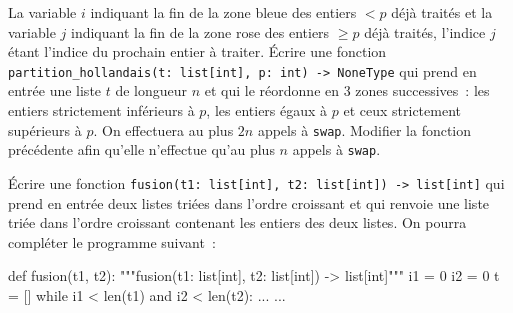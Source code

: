 \documentclass{magnolia}
\begin{document}
\begin{questions}
\begin{center}
\end{center}
La variable $i$ indiquant la fin de la zone bleue des entiers $< p$ déjà traités et
la variable $j$ indiquant la fin de la zone rose des entiers $\geq p$ déjà traités,
l'indice $j$ étant l'indice du prochain entier à traiter.
\question Écrire une fonction \verb!partition_hollandais(t: list[int], p: int) -> NoneType! qui prend
  en entrée une liste $t$ de longueur $n$ et qui le réordonne en 3 zones successives~:
  les entiers strictement inférieurs à $p$, les entiers égaux à $p$ et ceux strictement
  supérieurs à $p$. On effectuera au plus $2n$ appels à \verb!swap!.
\question Modifier la fonction précédente afin qu'elle n'effectue qu'au plus $n$ appels
  à \verb!swap!.
\end{questions}




Écrire une fonction \verb!fusion(t1: list[int], t2: list[int]) -> list[int]! qui prend en
entrée deux listes triées dans l'ordre croissant et qui renvoie une liste triée dans
l'ordre croissant contenant les entiers des deux listes. On pourra compléter le programme
suivant~:
\begin{pythoncode}
def fusion(t1, t2):
    """fusion(t1: list[int], t2: list[int]) -> list[int]"""
    i1 = 0
    i2 = 0
    t = []
    while i1 < len(t1) and i2 < len(t2):
        ...
    ...
\end{pythoncode}


\end{document}
